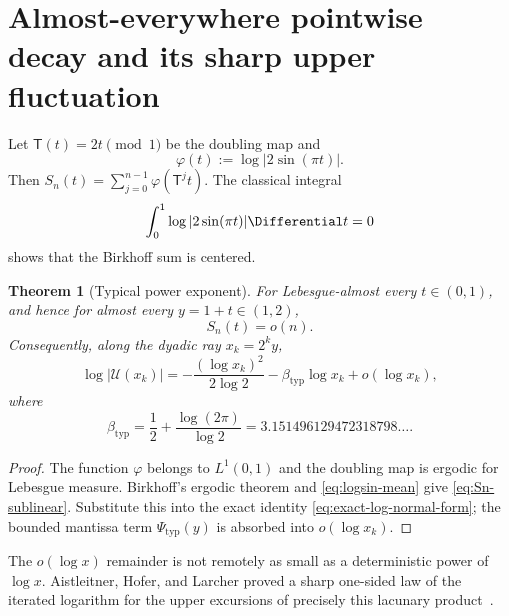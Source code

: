 \documentclass[11pt,oneside]{article}
\newtheorem{theorem}{Theorem}[section]
\theoremstyle{definition}
\theoremstyle{remark}
\newcommand{\Uhat}{\mathcal U}
\newcommand{\T}{\mathsf T}
\begin{document}
\section{Almost-everywhere pointwise decay and its sharp upper fluctuation}
\label{sec:typical}

Let $\T(t)=2t\pmod1$ be the doubling map and
\begin{equation}\label{eq:phi}
 \varphi(t):=\log|2\sin(\pi t)|.
\end{equation}
Then $S_n(t)=\sum_{j=0}^{n-1}\varphi(\T^jt)$.  The classical integral
\begin{equation}\label{eq:logsin-mean}
 \int_0^1\log|2\sin(\pi t)|\Differential t=0
\end{equation}
shows that the Birkhoff sum is centered.

\begin{theorem}[Typical power exponent]\label{thm:typical}
For Lebesgue-almost every $t\in(0,1)$, and hence for almost every $y=1+t\in(1,2)$,
\begin{equation}\label{eq:Sn-sublinear}
 S_n(t)=o(n).
\end{equation}
Consequently, along the dyadic ray $x_k=2^ky$,
\begin{equation}\label{eq:typical-log-asymptotic}
 \log|\Uhat(x_k)|
 =-\frac{(\log x_k)^2}{2\log2}
  -\beta_{\mathrm{typ}}\log x_k+o(\log x_k),
\end{equation}
where
\begin{equation}\label{eq:beta-typ-value}
 \beta_{\mathrm{typ}}
 =\frac12+\frac{\log(2\pi)}{\log2}
 =3.151496129472318798\ldots .
\end{equation}
\end{theorem}

\begin{proof}
The function $\varphi$ belongs to $L^1(0,1)$ and the doubling map is ergodic for
Lebesgue measure.  Birkhoff's ergodic theorem and \eqref{eq:logsin-mean} give
\eqref{eq:Sn-sublinear}.  Substitute this into the exact identity
\eqref{eq:exact-log-normal-form}; the bounded mantissa term
$\Psi_{\mathrm{typ}}(y)$ is absorbed into $o(\log x_k)$.
\end{proof}

The $o(\log x)$ remainder is not remotely as small as a deterministic power of
$\log x$.  Aistleitner, Hofer, and Larcher proved a sharp one-sided law of the
iterated logarithm for the upper excursions of precisely this lacunary
product~\cite{ahl2017}.
\end{document}
